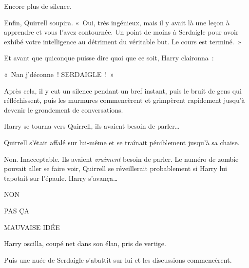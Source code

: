 Encore plus de silence.

Enfin, Quirrell soupira.
«~Oui, très ingénieux, mais il y avait là une leçon à apprendre et vous l'avez contournée.
Un point de moins à Serdaigle pour avoir exhibé votre intelligence au détriment du véritable but.
Le cours est terminé.~»

Et avant que quiconque puisse dire quoi que ce soit, Harry claironna~:

«~Nan j'déconne~! SERDAIGLE~!~»

Après cela, il y eut un silence pendant un bref instant, puis le bruit de gens qui réfléchissent, puis les murmures commencèrent et grimpèrent rapidement jusqu'à devenir le grondement de conversations.

Harry se tourna vers Quirrell, ils avaient besoin de parler…

Quirrell s'était affalé sur lui-même et se traînait péniblement jusqu'à sa chaise.

Non. Inacceptable.
Ils avaient \emph{vraiment} besoin de parler.
Le numéro de zombie pouvait aller se faire voir, Quirrell se réveillerait probablement si Harry lui tapotait sur l'épaule.
Harry s'avança…

NON

PAS ÇA

MAUVAISE IDÉE

Harry oscilla, coupé net dans son élan, pris de vertige.

Puis une nuée de Serdaigle s'abattit sur lui et les discussions commencèrent.~
